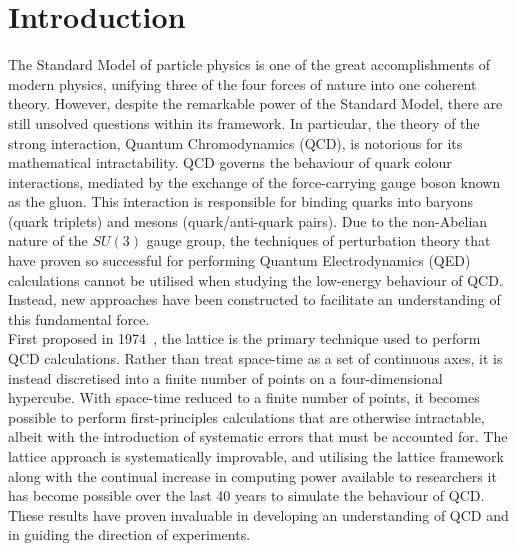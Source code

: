 
\chapter{Introduction}\label{chapter:Introduction}
\ifpdf
    \graphicspath{{Chapter1/Figs/Raster/}{Chapter1/Figs/PDF/}{Chapter1/Figs/}}
\else
    \graphicspath{{Chapter1/Figs/Vector/}{Chapter1/Figs/}}
\fi

The Standard Model of particle physics is one of the great accomplishments of modern physics, unifying three of the four forces of nature into one coherent theory. However, despite the remarkable power of the Standard Model, there are still unsolved questions within its framework. In particular, the theory of the strong interaction, Quantum Chromodynamics (QCD), is notorious for its mathematical intractability. QCD governs the behaviour of quark colour interactions, mediated by the exchange of the force-carrying gauge boson known as the gluon. This interaction is responsible for binding quarks into baryons (quark triplets) and mesons (quark/anti-quark pairs). Due to the non-Abelian nature of the $SU(3)$ gauge group, the techniques of perturbation theory that have proven so successful for performing Quantum Electrodynamics (QED) calculations cannot be utilised when studying the low-energy behaviour of QCD. Instead, new approaches have been constructed to facilitate an understanding of this fundamental force.\\

First proposed in 1974~\cite{Wilson:1974sk}, the lattice is the primary technique used to perform QCD calculations. Rather than treat space-time as a set of continuous axes, it is instead discretised into a finite number of points on a four-dimensional hypercube. With space-time reduced to a finite number of points, it becomes possible to perform first-principles calculations that are otherwise intractable, albeit with the introduction of systematic errors that must be accounted for. The lattice approach is systematically improvable, and utilising the lattice framework along with the continual increase in computing power available to researchers it has become possible over the last 40 years to simulate the behaviour of QCD. These results have proven invaluable in developing an understanding of QCD and in guiding the direction of experiments.\\

